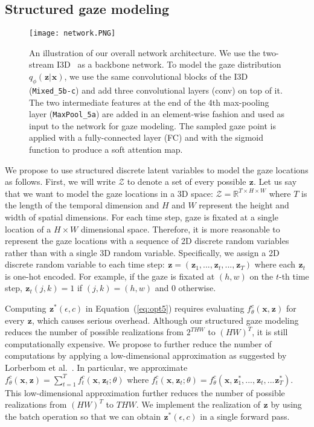 \documentclass[10pt,twocolumn,letterpaper]{article}
\newcommand{\varx}{\mathbf{\mspace{1mu}x}}
\newcommand{\varz}{\mathbf{\mspace{1mu}z}}
\begin{document}
\subsection{Structured gaze modeling} \label{subsec:gaze-modeling}

\begin{figure*}[t]
  \centering
  \texttt{[image: network.PNG]}
  \caption{An illustration of our overall network architecture. We use the two-stream I3D~\cite{carreira2017quo} as a backbone network. To model the gaze distribution $q_{\phi}(\varz|\varx)$, we use the same convolutional blocks of the I3D (\texttt{Mixed\_5b-c}) and add three convolutional layers (conv) on top of it. The two intermediate features at the end of the 4th max-pooling layer (\texttt{MaxPool\_5a}) are added in an element-wise fashion and used as input to the network for gaze modeling. The sampled gaze point is applied with a fully-connected layer (FC) and with the sigmoid function to produce a soft attention map.
  \label{fig:network}
  }
\end{figure*}

We propose to use structured discrete latent variables to model the gaze locations as follows. First, we will write $\mathcal{Z}$ to denote a set of every possible $\varz$. Let us say that we want to model the gaze locations in a 3D space: $\mathcal{Z}=\mathbb{R}^{T \times H \times W}$ where $T$ is the length of the temporal dimension and $H$ and $W$ represent the height and width of spatial dimensions. For each time step, gaze is fixated at a single location of a $H \times W$ dimensional space. Therefore, it is more reasonable to represent the gaze locations with a sequence of 2D discrete random variables rather than with a single 3D random variable. Specifically, we assign a 2D discrete random variable to each time step: $\varz=(\varz_1,...,\varz_t,...,\varz_T)$ where each $\varz_t$ is one-hot encoded. For example, if the gaze is fixated at $(h,w)$ on the $t$-th time step, $\varz_{t}(j,k)=1$ if $(j,k)=(h,w)$ and 0 otherwise.

Computing $\varz^*(\epsilon,c)$ in Equation~(\ref{eq:opt5}) requires evaluating $f_{\theta}^{c}(\varx,\varz)$ for every $\varz$, which causes serious overhead. Although our structured gaze modeling reduces the number of possible realizations from $2^{THW}$ to $(HW)^{T}$, it is still computationally expensive. We propose to further reduce the number of computations by applying a low-dimensional approximation as suggested by Lorberbom et al.~\cite{lorberbom2018direct}. In particular, we approximate $f_{\theta}^{c}(\varx,\varz)=\sum_{t=1}^{T} f_{t}^{c}(\varx,\varz_{t};\theta)$ where $f_{t}^{c}(\varx,\varz_{t};\theta)=f_{\theta}^{c}(\varx,\varz_{1}^{*},...,\varz_{t},...\varz_{T}^{*})$. This low-dimensional approximation further reduces the number of possible realizations from $(HW)^{T}$ to $THW$. We implement the realization of $\varz$ by using the batch operation so that we can obtain $\varz^*(\epsilon,c)$ in a single forward pass.
\end{document}
